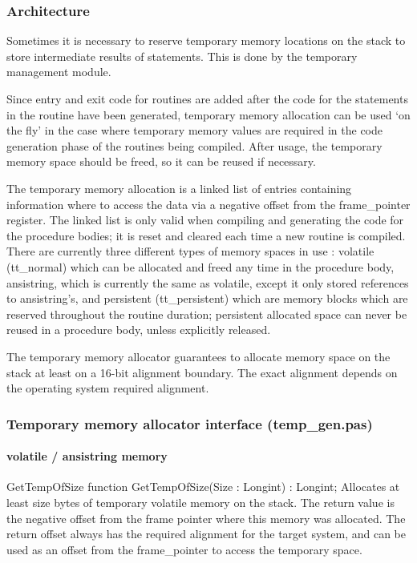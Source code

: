 \documentclass [12pt]{article}
\begin{document}
\subsubsection{Architecture}
\label{subsubsec:architecturemory}

Sometimes it is necessary to reserve temporary memory locations on the stack 
to store intermediate results of statements. This is done by the temporary 
management module. 

Since entry and exit code for routines are added after the code for the 
statements in the routine have been generated, temporary memory allocation 
can be used `on the fly' in the case where temporary memory values are 
required in the code generation phase of the routines being compiled. After 
usage, the temporary memory space should be freed, so it can be reused if 
necessary.

The temporary memory allocation is a linked list of entries containing 
information where to access the data via a negative offset from the 
frame{\_}pointer register. The linked list is only valid when compiling and 
generating the code for the procedure bodies; it is reset and cleared each 
time a new routine is compiled. There are currently three different types of 
memory spaces in use : volatile (\textsf{tt{\_}normal}) which can be 
allocated and freed any time in the procedure body, ansistring, which is 
currently the same as volatile, except it only stored references to 
ansistring's, and persistent (\textsf{tt{\_}persistent}) which are memory 
blocks which are reserved throughout the routine duration; persistent 
allocated space can never be reused in a procedure body, unless explicitly 
released.

The temporary memory allocator guarantees to allocate memory space on the 
stack at least on a 16-bit alignment boundary. The exact alignment depends 
on the operating system required alignment.

\subsubsection{Temporary memory allocator interface (temp{\_}gen.pas)}
\label{subsubsec:temporary}

\paragraph{volatile / ansistring memory}

\begin{function}{GetTempOfSize}
\Declaration
function GetTempOfSize(Size : Longint) : Longint;
\Description 
Allocates at least \textsf{size} bytes of temporary volatile memory on the
stack. The return value is the negative offset from the frame pointer where
this memory was allocated. 
\Notes 
The return offset always has the required alignment for the target system,
and can be used as an offset from the frame{\_}pointer to access the
temporary space. 
\end{function}
\end{document}
